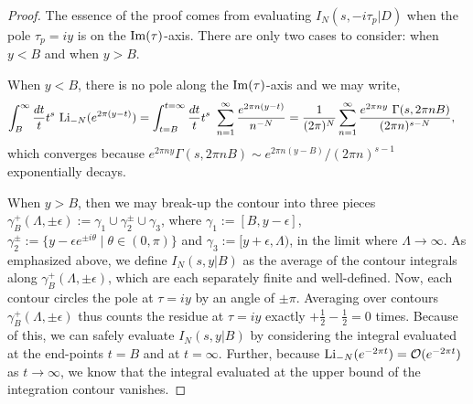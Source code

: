 \documentclass[11pt,a4paper]{article}
\newcommand{\g}{\gamma}
\newcommand{\e}{\epsilon}
\newcommand{\G}{\Gamma}
\newcommand{\La}{\Lambda}
\begin{document}
\begin{proof}
The essence of the proof comes from evaluating $I_N(s,-i \tau_p|D)$ when the pole $\tau_p = i y$ is on the ${\rm Im}(\tau)$-axis. There are only two cases to consider: when $y < B$ and when $y > B$.

When $y < B$, there is no pole along the ${\rm Im}(\tau)$-axis and we may write,
\begin{align}
\int_{B}^{\infty} \frac{dt}{t} t^s~{\rm Li}_{-N}(e^{2 \pi(y-t)}) &= 
\int_{t = B}^{t = \infty} \frac{dt}{t} t^s~\sum_{n = 1}^{\infty} \frac{e^{2 \pi n(y-t)} }{n^{-N}} = \frac{1}{(2\pi)^N}\sum_{n = 1}^{\infty} \frac{e^{2 \pi n y}~\G(s,2\pi n B) }{(2 \pi n)^{s-N}},
\end{align}
which converges because $e^{2 \pi n y}\G(s,2 \pi n B) \sim e^{2 \pi n(y-B)}/(2\pi n)^{s-1}$ exponentially decays.

When $y > B$, then we may break-up the contour into three pieces $\g_B^+(\La,\pm \e):=\g_1 \cup \g^{\pm}_2 \cup \g_3$, where $\g_1:=[B , y-\e]$, $\g_2^{\pm} := \{ y - \e e^{\pm i \theta} \mid \theta \in (0,\pi) \}$ and $\g_3 := [y+\e,\La)$, in the limit where $\La \to \infty$. As emphasized above, we define $I_N(s,y|B)$ as the average of the contour integrals along $\g_B^+(\La,\pm\e)$, which are each separately finite and well-defined. Now, each contour circles the pole at $\tau = i y$ by an angle of $\pm \pi$. Averaging over contours $\g_B^+(\La,\pm \e)$ thus counts the residue at $\tau = i y$ exactly $+\tfrac12-\tfrac12 = 0$ times. Because of this, we can safely evaluate $I_N(s,y|B)$ by considering the integral evaluated at the end-points $t = B$ and at $t = \infty$. Further, because ${\rm Li}_{-N}(e^{-2 \pi t}) = {\cal O}(e^{-2\pi t})$ as $t \to \infty$, we know that the integral evaluated at the upper bound of the integration contour vanishes. 


\end{proof}
\end{document}

